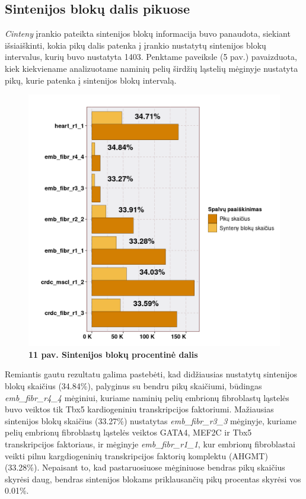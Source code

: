\documentclass[12pt]{article}
\begin{document}
\newpage

\subsection{Sintenijos blokų dalis pikuose}
\emph{Cinteny} įrankio pateikta sintenijos blokų informacija buvo panaudota,
siekiant išsiaiškinti, kokia pikų dalis patenka į įrankio nustatytų sintenijos
blokų intervalus, kurių buvo nustatyta 1403. Penktame paveiksle (5 pav.)
pavaizduota, kiek kiekviename analizuotame naminių pelių širdžių ląstelių
mėginyje nustatyta pikų, kurie patenka į sintenijos blokų intervalą.

\begin{figure}[htb]
    \begin{center}
        \includegraphics[width=0.8\linewidth]{../Figures/Synteny_blocks_peaks.png}
        \vspace{-2\baselineskip}
        \caption*{\small\textbf{11 pav. Sintenijos blokų procentinė dalis}}
        \label{fig:birds}
    \end{center}
\end{figure}

Remiantis gautu rezultatu galima pastebėti, kad didžiausias nustatytų sintenijos
blokų skaičius (34.84\%), palyginus su bendru pikų skaičiumi, būdingas
\emph{emb\_fibr\_r4\_4} mėginiui, kuriame naminių pelių embrionų fibroblastų
ląstelės buvo veiktos tik Tbx5 kardiogeniniu transkripcijos faktoriumi.
Mažiausias sintenijos blokų skaičius (33.27\%) nustatytas
\emph{emb\_fibr\_r3\_3} mėginyje, kuriame pelių embrionų fibroblastų ląstelės
veiktos GATA4, MEF2C ir Tbx5 transkripcijos faktoriaus, ir mėginyje
\emph{emb\_fibr\_r1\_1}, kur embrionų fibroblastai veikti pilnu kargdiogeninių
transkripcijos faktorių komplektu (AHGMT) (33.28\%). Nepaisant to, kad
pastaruosiuose mėginiuose bendras pikų skaičius skyrėsi daug, bendras sintenijos
blokams priklausančių pikų procentas skyrėsi vos 0.01\%.
\end{document}

